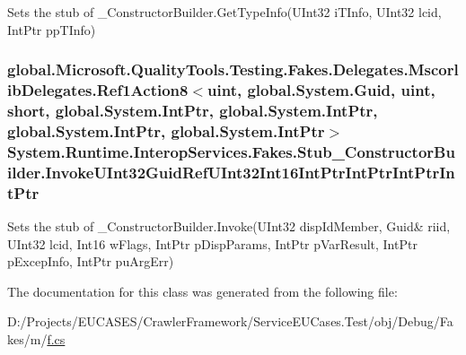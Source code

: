 Sets the stub of \-\_\-\-Constructor\-Builder.\-Get\-Type\-Info(\-U\-Int32 i\-T\-Info, U\-Int32 lcid, Int\-Ptr pp\-T\-Info)

\hypertarget{class_system_1_1_runtime_1_1_interop_services_1_1_fakes_1_1_stub___constructor_builder_ab04d66a4c5d4fe515748189ed6c39608}{
\subsubsection[{Invoke\-U\-Int32\-Guid\-Ref\-U\-Int32\-Int16\-Int\-Ptr\-Int\-Ptr\-Int\-Ptr\-Int\-Ptr}]{\setlength{\rightskip}{0pt plus 5cm}global.\-Microsoft.\-Quality\-Tools.\-Testing.\-Fakes.\-Delegates.\-Mscorlib\-Delegates.\-Ref1\-Action8$<$uint, global.\-System.\-Guid, uint, short, global.\-System.\-Int\-Ptr, global.\-System.\-Int\-Ptr, global.\-System.\-Int\-Ptr, global.\-System.\-Int\-Ptr$>$ System.\-Runtime.\-Interop\-Services.\-Fakes.\-Stub\-\_\-\-Constructor\-Builder.\-Invoke\-U\-Int32\-Guid\-Ref\-U\-Int32\-Int16\-Int\-Ptr\-Int\-Ptr\-Int\-Ptr\-Int\-Ptr}}\label{class_system_1_1_runtime_1_1_interop_services_1_1_fakes_1_1_stub___constructor_builder_ab04d66a4c5d4fe515748189ed6c39608}


Sets the stub of \-\_\-\-Constructor\-Builder.\-Invoke(U\-Int32 disp\-Id\-Member, Guid\& riid, U\-Int32 lcid, Int16 w\-Flags, Int\-Ptr p\-Disp\-Params, Int\-Ptr p\-Var\-Result, Int\-Ptr p\-Excep\-Info, Int\-Ptr pu\-Arg\-Err)



The documentation for this class was generated from the following file\-:\begin{DoxyCompactItemize}
\item 
D\-:/\-Projects/\-E\-U\-C\-A\-S\-E\-S/\-Crawler\-Framework/\-Service\-E\-U\-Cases.\-Test/obj/\-Debug/\-Fakes/m/\hyperlink{m_2f_8cs}{f.\-cs}\end{DoxyCompactItemize}
